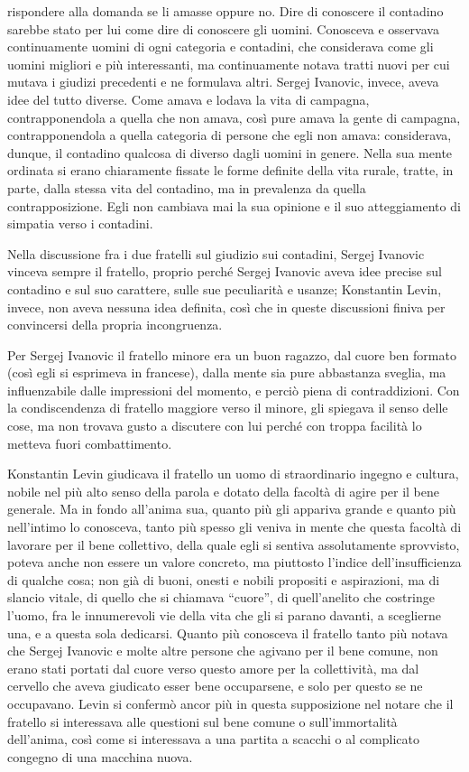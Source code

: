 rispondere alla domanda se li amasse oppure no. Dire di conoscere il contadino sarebbe stato per lui come dire di conoscere gli uomini. Conosceva e osservava continuamente uomini di ogni categoria e contadini, che considerava come gli uomini migliori e più interessanti, ma continuamente notava tratti nuovi per cui mutava i giudizi precedenti e ne formulava altri. Sergej Ivanovic, invece, aveva idee del tutto diverse. Come amava e lodava la vita di campagna, contrapponendola a quella che non amava, così pure amava la gente di campagna, contrapponendola a quella categoria di persone che egli non amava: considerava, dunque, il contadino qualcosa di diverso dagli uomini in genere. Nella sua mente ordinata si erano chiaramente fissate le forme definite della vita rurale, tratte, in parte, dalla stessa vita del contadino, ma in prevalenza da quella contrapposizione. Egli non cambiava mai la sua opinione e il suo atteggiamento di simpatia verso i contadini. 

Nella discussione fra i due fratelli sul giudizio sui contadini, Sergej Ivanovic vinceva sempre il fratello, proprio perché Sergej Ivanovic aveva idee precise sul contadino e sul suo carattere, sulle sue peculiarità e usanze; Konstantin Levin, invece, non aveva nessuna idea definita, così che in queste discussioni finiva per convincersi della propria incongruenza. 

Per Sergej Ivanovic il fratello minore era un buon ragazzo, dal cuore ben formato (così egli si esprimeva in francese), dalla mente sia pure abbastanza sveglia, ma influenzabile dalle impressioni del momento, e perciò piena di contraddizioni. Con la condiscendenza di fratello maggiore verso il minore, gli spiegava il senso delle cose, ma non trovava gusto a discutere con lui perché con troppa facilità lo metteva fuori combattimento. 

Konstantin Levin giudicava il fratello un uomo di straordinario ingegno e cultura, nobile nel più alto senso della parola e dotato della facoltà di agire per il bene generale. Ma in fondo all'anima sua, quanto più gli appariva grande e quanto più nell'intimo lo conosceva, tanto più spesso gli veniva in mente che questa facoltà di lavorare per il bene collettivo, della quale egli si sentiva assolutamente sprovvisto, poteva anche non essere un valore concreto, ma piuttosto l'indice dell'insufficienza di qualche cosa; non già di buoni, onesti e nobili propositi e aspirazioni, ma di slancio vitale, di quello che si chiamava ``cuore'', di quell'anelito che costringe l'uomo, fra le innumerevoli vie della vita che gli si parano davanti, a sceglierne una, e a questa sola dedicarsi. Quanto più conosceva il fratello tanto più notava che Sergej Ivanovic e molte altre persone che agivano per il bene comune, non erano stati portati dal cuore verso questo amore per la collettività, ma dal cervello che aveva giudicato esser bene occuparsene, e solo per questo se ne occupavano. Levin si confermò ancor più in questa supposizione nel notare che il fratello si interessava alle questioni sul bene comune o sull'immortalità dell'anima, così come si interessava a una partita a scacchi o al complicato congegno di una macchina nuova. 

